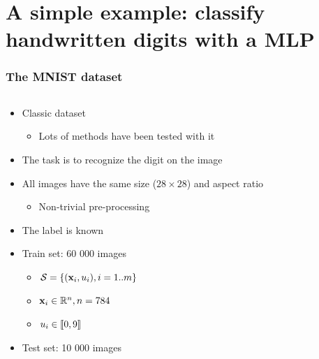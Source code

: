 \section[A simple example: MLP]{A simple example: classify handwritten digits with a \acl{MLP}}

\begin{frame}
  \frametitle{The MNIST dataset}
  \begin{columns}
    \begin{column}{0.5\textwidth}
      \begin{itemize}
      \item Classic dataset
        \begin{itemize}
        \item Lots of methods have been tested with it
        \end{itemize}
      \item The task is to recognize the digit on the image
      \item<2-> All images have the same size ($28 \times 28$) and aspect ratio
        \begin{itemize}
        \item Non-trivial pre-processing
        \end{itemize}
      \item<2-> The label is known
      \item<3-> Train set: 60 000 images
        \begin{itemize}
        \item $\mathcal{S} =
          \left \lbrace {\ensuremath{\left ( {\mathbf{x}_{i}}, {u_{i}} \right )}} , {i=1..m} \right \rbrace$
        \item $\mathbf{x}_i \in \mathbb{R}^{n}, n = 784$
        \item $u_i \in \left \llbracket {0}, {9} \right \rrbracket$
        \end{itemize}
      \item<3-> Test set: 10 000 images
      \end{itemize}
    \end{column}
    \begin{column}{0.5\textwidth}
\end{column}
\end{columns}
\end{frame}
